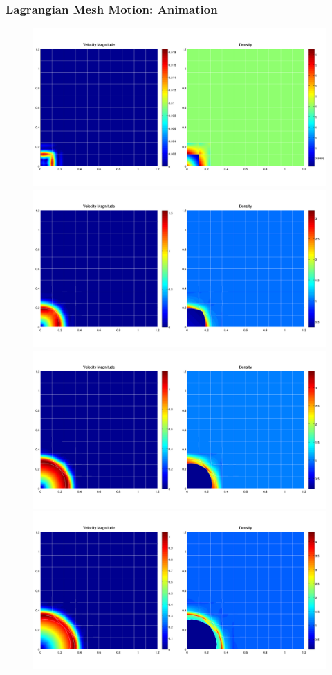 \documentclass[8pt,xcolor=svgnames]{beamer}
\begin{document}
\begin{frame}
 \frametitle{Lagrangian Mesh Motion: Animation} 
\begin{figure}[ht]
\begin{animateinline}[autoplay,width=\textwidth]{1}
    \includegraphics{./Images/SedovAnimation/SedovAnimation_00.png}
    \newframe[1]
    \includegraphics{./Images/SedovAnimation/SedovAnimation_10.png}
    \newframe[1]
    \includegraphics{./Images/SedovAnimation/SedovAnimation_20.png}
    \newframe[1]
    \includegraphics{./Images/SedovAnimation/SedovAnimation_30.png}

\end{animateinline}
\end{figure}
\end{frame}
\end{document}
